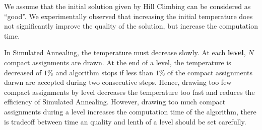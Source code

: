  \begin{comment}
 Tabular~\ref{tab:poorgood} shows the average margin of the solutions produced by Simulated Annealing when intialized with temperatures computed from the previous routine. The initial solution used by Simulated Annealing is the solution given by hill climbing initialized by \hybridgreedynormalized. The experiment is made on $100$ random instances.


\begin{center}
\begin{tabular}{ |c|c|c|c|c| }
\hline
 Quality of initial configuration & Good& Poor\\
    \hline
    $t_0$ & $1788$& $4153$\\
    \hline
    Average margin & $4212$ & $4217$ \\
        \hline
    Computation time (ms) &  $2817$&$4035$ \\

    \hline
    
 \end{tabular}
 \captionof{figure}{Comparison of two intial temperatures, considering the quality of the initial configuration}
     \label{tab:poorgood}
 \end{center}
<<<<<<< HEAD
 We assume that the initial solution given by Hill Climbing can be considered as ``good''. Indeed, increasing the initial temperature does not improve the quality of the solution, but it increases the computation time.
 
 In Simulated Annealing, the temperature should decrease slowly. At each \textbf{level}, $N$ compact representations are drawn. At the end of a level, the temperature is decreased by $10\%$. The algorithm stops if less than $1\%$ of the compact representations drawn are accepted during two consecutive steps. Hence, drawing too few compact representations per level decreases the temperature too fast and reduces the efficiency of Simulated Annealing. However, drawing too much compact representations during a level increases the computation time of the algorithm, hence there is tradeoff between time an quality and lenth of a level should be set carefully.
=======
 \end{comment}
 We assume that the initial solution given by Hill Climbing can be considered as ``good''. We experimentally observed that increasing the initial temperature does not significantly improve the quality of the solution, but increase the computation time.
 
 In Simulated Annealing, the temperature must decrease slowly. At each \textbf{level}, $N$ compact assignments are drawn. At the end of a level, the temperature is decreased of $1\%$ and algorithm stops if less than $1\%$ of the compact assignments darwn are accepted during two consecutive steps. Hence, drawing too few compact assignments by level decreases the temperature too fast and reduces the efficiency of Simulated Annealing. However, drawing too much compact assignments during a level increases the computation time of the algorithm, there is tradeoff between time an quality and lenth of a level should be set carefully.


